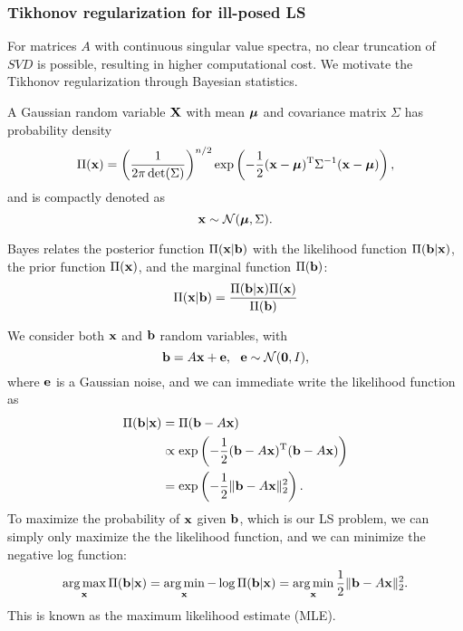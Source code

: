 \documentclass{article}
\begin{document}
\subsubsection{Tikhonov regularization for ill-posed LS}
For matrices $A$ with continuous singular value spectra, no clear truncation of $SVD$ is possible, resulting in higher computational cost. We motivate the Tikhonov regularization through Bayesian statistics.
\begin{definition}
    A Gaussian random variable $\bm{\mathrm{X}}$ with mean $\bm{\mathrm{\mu}}$ and covariance matrix $\Sigma$ has probability density
    \begin{equation}
        \Pi(\bm{\mathrm{x}})=\left(\frac{1}{2\pi\det(\Sigma)}\right)^{n/2}\exp\left( -\frac{1}{2}(\bm{\mathrm{x}}-\bm{\mathrm{\mu}})^{\text{T}}\Sigma^{-1}(\bm{\mathrm{x}}-\bm{\mathrm{\mu}}) \right),
    \end{equation}
    and is compactly denoted as 
    \begin{equation}
        \bm{\mathrm{x}}\sim\mathcal{N}(\bm{\mathrm{\mu}},\Sigma).
    \end{equation}
\end{definition}
\begin{theorem}
Bayes relates the posterior function $\Pi(\bm{\mathrm{x}}|\bm{\mathrm{b}})$ with the likelihood function $\Pi(\bm{\mathrm{b}}|\bm{\mathrm{x}})$, the prior function $\Pi(\bm{\mathrm{x}})$, and the marginal function $\Pi(\bm{\mathrm{b}})$:
    \begin{equation}
        \Pi(\bm{\mathrm{x}}|\bm{\mathrm{b}})=\frac{\Pi(\bm{\mathrm{b}}|\bm{\mathrm{x}})\Pi(\bm{\mathrm{x}})}{\Pi(\bm{\mathrm{b}})}
    \end{equation}
\end{theorem}
We consider both $\bm{\mathrm{x}}$ and $\bm{\mathrm{b}}$ random variables, with
\begin{equation}
    \bvec{b}=A\bvec{x}+\bvec{e},\ \ \bvec{e}\sim\mathcal{N}(\bvec{0},I),
\end{equation}
where $\bm{\mathrm{e}}$ is a Gaussian noise, and we can immediate write the likelihood function as 
\begin{align}
    \Pi(\bm{\mathrm{b}}|\bm{\mathrm{x}})&=\Pi(\bm{\mathrm{b}}-A\bm{\mathrm{x}})\\
    &\propto\exp\left(-\frac{1}{2}(\bm{\mathrm{b}}-A\bm{\mathrm{x}})^{\text{T}}(\bm{\mathrm{b}}-A\bm{\mathrm{x}})\right)\\
    &=\exp\left(-\frac{1}{2}\lVert\bm{\mathrm{b}}-A\bm{\mathrm{x}}\rVert_2^2\right).
\end{align}
To maximize the probability of $\bm{\mathrm{x}}$ given $\bm{\mathrm{b}}$, which is our LS problem, we can simply only maximize the the likelihood function, and we can minimize the negative log function:
\begin{equation}
    \operatorname*{arg\,max}_{\bm{\mathrm{x}}}\Pi(\bm{\mathrm{b}}|\bm{\mathrm{x}})=\operatorname*{arg\,min}_{\bm{\mathrm{x}}}-\log\Pi(\bm{\mathrm{b}}|\bm{\mathrm{x}})=\operatorname*{arg\,min}_{\bm{\mathrm{x}}}\frac{1}{2}\lVert\bm{\mathrm{b}}-A\bm{\mathrm{x}}\rVert_2^2.
\end{equation}
This is known as the maximum likelihood estimate (MLE).
\end{document}
